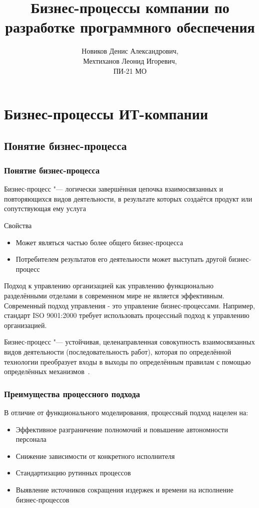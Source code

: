 \documentclass{../industrial-development}
\title{Бизнес-процессы компании по разработке программного обеспечения}
\author{Новиков Денис Александрович, \\Мехтиханов Леонид Игоревич, \\ПИ-21 МО}
\date{}
\begin{document}
\begin{frame}
  \titlepage
\end{frame}


\section{Бизнес-процессы ИТ-компании}

\subsection{Понятие бизнес-процесса}


\begin{frame} \frametitle{Понятие бизнес-процесса}
	\begin{block}{}
		\alert{Бизнес-процесс} "--- логически завершённая цепочка взаимосвязанных и повторяющихся видов деятельности, в результате которых создаётся продукт или сопутствующая ему услуга
	\end{block}
	\begin{block}{Свойства}
		\begin{itemize}
			\item Может являться частью более общего бизнес-процесса
			\item Потребителем результатов его деятельности может выступать другой бизнес-процесс
		\end{itemize}
	\end{block}
\end{frame}

\lecturenotes

Подход к управлению организацией как управлению функционально разделёнными отделами в современном мире не является эффективным.  Современный подход управления - это управление бизнес-процессами. Например, стандарт ISO 9001:2000 требует использовать процессный подход к управлению организацией.

Бизнес-процесс "--- устойчивая, целенаправленная совокупность взаимосвязанных видов деятельности (последовательность работ), которая по определённой технологии преобразует входы в выходы по определённым правилам с помощью определённых механизмов~\cite{BStudio}.


\begin{frame} \frametitle{Преимущества процессного подхода}
	В отличие от функционального моделирования, процессный подход нацелен на:
	\begin{itemize}
		\item Эффективное разграничение полномочий и повышение автономности персонала
		\item Снижение зависимости от конкретного исполнителя
		\item Стандартизацию рутинных процессов
		\item Выявление источников сокращения издержек и времени на исполнение бизнес-процессов
	\end{itemize}
\end{frame}
\end{document}
